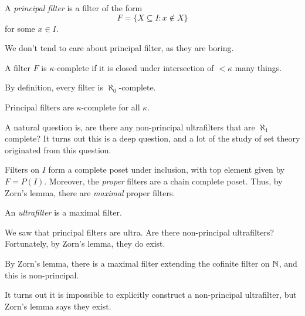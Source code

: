 \documentclass[a4paper]{article}
\begin{document}
\begin{defi}
  A \emph{principal filter} is a filter of the form
  \[
    F = \{X \subseteq I: x \not\in X\}
  \]
  for some $x \in I$.
\end{defi}
We don't tend to care about principal filter, as they are boring.

\begin{defi}
  A filter $F$ is $\kappa$-complete if it is closed under intersection of $<\kappa$ many things.
\end{defi}

\begin{eg}
  By definition, every filter is $\aleph_0$-complete.
\end{eg}

\begin{eg}
  Principal filters are $\kappa$-complete for all $\kappa$.
\end{eg}

A natural question is, are there any non-principal ultrafilters that are $\aleph_1$ complete? It turns out this is a deep question, and a lot of the study of set theory originated from this question.

Filters on $I$ form a complete poset under inclusion, with top element given by $F = P(I)$. Moreover, the \emph{proper} filters are a chain complete poset. Thus, by Zorn's lemma, there are \emph{maximal} proper filters.
\begin{defi}[Ultrafilter]
  An \emph{ultrafilter} is a maximal filter.
\end{defi}

We saw that principal filters are ultra. Are there non-principal ultrafilters? Fortunately, by Zorn's lemma, they do exist.
\begin{eg}
  By Zorn's lemma, there is a maximal filter extending the cofinite filter on $\mathbb{N}$, and this is non-principal.
\end{eg}
It turns out it is impossible to explicitly construct a non-principal ultrafilter, but Zorn's lemma says they exist.

\end{document}

